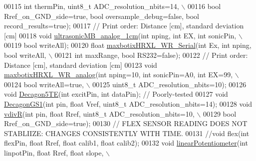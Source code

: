 \begin{DoxyCode}
00115           \textcolor{keywordtype}{int} thermPin, uint8\_t ADC\_resolution\_nbits=14, \(\backslash\)
00116           \textcolor{keywordtype}{bool} Rref\_on\_GND\_side=\textcolor{keyword}{true}, \textcolor{keywordtype}{bool} oversample\_debug=\textcolor{keyword}{false}, \textcolor{keywordtype}{bool} record\_results=\textcolor{keyword}{true});
00117     \textcolor{comment}{// Print order: Distance [cm], standard deviation [cm]}
00118     \textcolor{keywordtype}{void} \hyperlink{classLogger_a362a1462166d63ddc613eaa1e86f9854}{ultrasonicMB\_analog\_1cm}(\textcolor{keywordtype}{int} nping, \textcolor{keywordtype}{int} EX, \textcolor{keywordtype}{int} sonicPin, \(\backslash\)
00119          \textcolor{keywordtype}{bool} writeAll);
00120     \textcolor{keywordtype}{float} \hyperlink{classLogger_a87ce56cb9c3dfc7abfd6308b2ee7dc10}{maxbotixHRXL\_WR\_Serial}(\textcolor{keywordtype}{int} Ex, \textcolor{keywordtype}{int} nping, \textcolor{keywordtype}{bool} writeAll, \(\backslash\)
00121           \textcolor{keywordtype}{int} maxRange, \textcolor{keywordtype}{bool} RS232=\textcolor{keyword}{false});
00122     \textcolor{comment}{// Print order: Distance [cm], standard deviation [cm]}
00123     \textcolor{keywordtype}{void} \hyperlink{classLogger_a3ce2869bbd48fdebbf44e155981c85b0}{maxbotixHRXL\_WR\_analog}(\textcolor{keywordtype}{int} nping=10, \textcolor{keywordtype}{int} sonicPin=A0, \textcolor{keywordtype}{int} EX=99, \(\backslash\)
00124          \textcolor{keywordtype}{bool} writeAll=\textcolor{keyword}{true}, \(\backslash\)
00125          uint8\_t ADC\_resolution\_nbits=10);
00126     \textcolor{keywordtype}{void} \hyperlink{classLogger_a40ae372dee7f672a6d6f33ab441e4da1}{Decagon5TE}(\textcolor{keywordtype}{int} excitPin, \textcolor{keywordtype}{int} dataPin); \textcolor{comment}{// Poorly-tested}
00127     \textcolor{keywordtype}{void} \hyperlink{classLogger_a84da6a9ec3d4d56fdc32d950b71f1a26}{DecagonGS1}(\textcolor{keywordtype}{int} pin, \textcolor{keywordtype}{float} Vref, uint8\_t ADC\_resolution\_nbits=14);
00128     \textcolor{keywordtype}{void} \hyperlink{classLogger_ab1ae31b2bdb77c86fb6851907258171b}{vdivR}(\textcolor{keywordtype}{int} pin, \textcolor{keywordtype}{float} Rref, uint8\_t ADC\_resolution\_nbits=10, \(\backslash\)
00129          \textcolor{keywordtype}{bool} Rref\_on\_GND\_side=\textcolor{keyword}{true});
00130     \textcolor{comment}{// FLEX SENSOR READING DOES NOT STABLIIZE: CHANGES CONSISTENTLY WITH TIME.}
00131     \textcolor{comment}{//void flex(int flexPin, float Rref, float calib1, float calib2);}
00132     \textcolor{keywordtype}{void} \hyperlink{classLogger_a95670d06ec3b68300895cd7bf8c37999}{linearPotentiometer}(\textcolor{keywordtype}{int} linpotPin, \textcolor{keywordtype}{float} Rref, \textcolor{keywordtype}{float} slope, \(\backslash\)

\end{DoxyCode}
